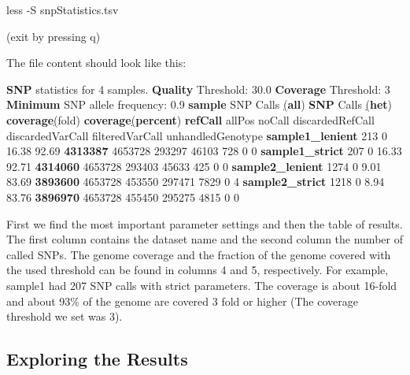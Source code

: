 \documentclass[
  letterpaper,
]{book}
\newenvironment{Shaded}{}{}
\newcommand{\AttributeTok}[1]{\textcolor[rgb]{0.84,0.23,0.29}{#1}}
\newcommand{\ErrorTok}[1]{\textcolor[rgb]{1.00,0.33,0.33}{\underline{#1}}}
\newcommand{\ExtensionTok}[1]{\textcolor[rgb]{0.84,0.23,0.29}{\textbf{#1}}}
\newcommand{\FunctionTok}[1]{\textcolor[rgb]{0.44,0.26,0.76}{#1}}
\newcommand{\KeywordTok}[1]{\textcolor[rgb]{0.84,0.23,0.29}{#1}}
\newcommand{\NormalTok}[1]{\textcolor[rgb]{0.14,0.16,0.18}{#1}}
\begin{document}
\begin{Shaded}
\begin{Highlighting}[]
\FunctionTok{less} \AttributeTok{{-}S}\NormalTok{ snpStatistics.tsv}
\end{Highlighting}
\end{Shaded}

(exit by pressing q)

The file content should look like this:

\begin{Shaded}
\begin{Highlighting}[]
\ExtensionTok{SNP}\NormalTok{ statistics for 4 samples.}
\ExtensionTok{Quality}\NormalTok{ Threshold: 30.0}
\ExtensionTok{Coverage}\NormalTok{ Threshold: 3}
\ExtensionTok{Minimum}\NormalTok{ SNP allele frequency: 0.9}
\ExtensionTok{sample}\NormalTok{  SNP Calls }\ErrorTok{(}\ExtensionTok{all}\KeywordTok{)} \ExtensionTok{SNP}\NormalTok{ Calls }\ErrorTok{(}\ExtensionTok{het}\KeywordTok{)} \ExtensionTok{coverage}\ErrorTok{(}\FunctionTok{fold}\KeywordTok{)}  \ExtensionTok{coverage}\ErrorTok{(}\ExtensionTok{percent}\KeywordTok{)}
\ExtensionTok{refCall}\NormalTok{ allPos  noCall  discardedRefCall    discardedVarCall    filteredVarCall unhandledGenotype}
\ExtensionTok{sample1\_lenient}\NormalTok{ 213 0   16.38   92.69}
\ExtensionTok{4313387}\NormalTok{ 4653728 293297  46103   728 0   0}
\ExtensionTok{sample1\_strict}\NormalTok{  207 0   16.33   92.71}
\ExtensionTok{4314060}\NormalTok{ 4653728 293403  45633   425 0   0}
\ExtensionTok{sample2\_lenient}\NormalTok{ 1274    0   9.01    83.69}
\ExtensionTok{3893600}\NormalTok{ 4653728 453550  297471  7829    0   4}
\ExtensionTok{sample2\_strict}\NormalTok{  1218    0   8.94    83.76}
\ExtensionTok{3896970}\NormalTok{ 4653728 455450  295275  4815    0   0}
\end{Highlighting}
\end{Shaded}

First we find the most important parameter settings and then the table
of results. The first column contains the dataset name and the second
column the number of called SNPs. The genome coverage and the fraction
of the genome covered with the used threshold can be found in columns 4
and 5, respectively. For example, sample1 had 207 SNP calls with strict
parameters. The coverage is about 16-fold and about 93\% of the genome
are covered 3 fold or higher (The coverage threshold we set was 3).

\hypertarget{exploring-the-results}{%
\subsection{Exploring the Results}\label{exploring-the-results}}
\end{document}
